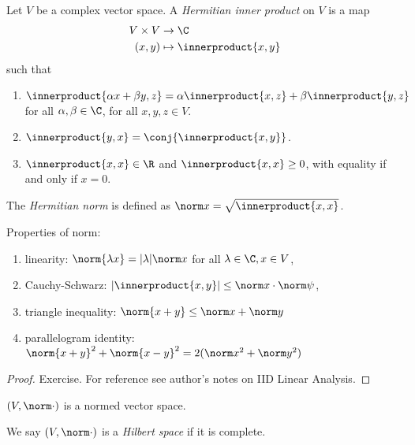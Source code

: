 \documentclass[a4paper]{article}
\newcommand*{\ip}{\innerproduct} %
\begin{document}
\begin{definition}
  Let \(V\) be a complex vector space. A \emph{Hermitian inner product} on \(V\) is a map
  \begin{align*}
    V \times V &\to \C \\
    (x, y) &\mapsto \ip{x, y}
  \end{align*}
  such that
  \begin{enumerate}
  \item \(\ip{\alpha x + \beta y, z} = \alpha \ip{x, z} + \beta \ip{y, z}\) for all \(\alpha, \beta \in \C\), for all \(x, y, z \in V\).
  \item \(\ip{y, x} = \conj{\ip{x, y}}\).
  \item \(\ip{x, x} \in \R\) and \(\ip{x, x} \geq 0\), with equality if and only if \(x = 0\).
  \end{enumerate}
\end{definition}

\begin{definition}
  The \emph{Hermitian norm} is defined as \(\norm x = \sqrt{\ip{x, x}}\).
\end{definition}

\begin{lemma}
  Properties of norm:
  \begin{enumerate}
  \item linearity: \(\norm{\lambda x} = |\lambda| \norm x\) for all \(\lambda \in \C, x \in V\),
  \item Cauchy-Schwarz: \(|\ip{x, y}| \leq \norm x \cdot \norm \psi\),
  \item triangle inequality: \(\norm{x + y} \leq \norm x + \norm y\)
  \item parallelogram identity: \(\norm{x + y}^2 + \norm{x - y}^2 = 2(\norm x^2 + \norm y^2)\)
  \end{enumerate}
\end{lemma}

\begin{proof}
  Exercise. For reference see author's notes on IID Linear Analysis.
\end{proof}

\begin{corollary}
  \((V, \norm \cdot)\) is a normed vector space.
\end{corollary}

\begin{definition}
  We say \((V, \norm \cdot)\) is a \emph{Hilbert space} if it is complete.
\end{definition}
\end{document}
